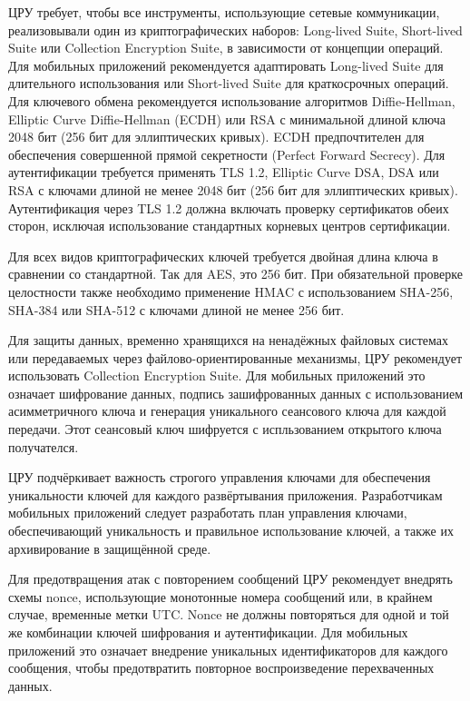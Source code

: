 ЦРУ требует, чтобы все инструменты, использующие сетевые коммуникации, реализовывали один из криптографических наборов: Long-lived Suite, Short-lived Suite или Collection Encryption Suite, в зависимости от концепции операций. Для мобильных приложений рекомендуется адаптировать Long-lived Suite для длительного использования или Short-lived Suite для краткосрочных операций.
Для ключевого обмена рекомендуется использование алгоритмов Diffie-Hellman, Elliptic Curve Diffie-Hellman (ECDH) или RSA с минимальной длиной ключа 2048 бит (256 бит для эллиптических кривых). ECDH предпочтителен для обеспечения совершенной прямой секретности (Perfect Forward Secrecy).
Для аутентификации требуется применять TLS 1.2, Elliptic Curve DSA, DSA или RSA с ключами длиной не менее 2048 бит (256 бит для эллиптических кривых). Аутентификация через TLS 1.2 должна включать проверку сертификатов обеих сторон, исключая использование стандартных корневых центров сертификации.

Для всех видов криптографических ключей требуется двойная длина ключа в сравнении со стандартной. Так для AES, это 256 бит.
При обязательной проверке целостности также необходимо применение HMAC с использованием SHA-256, SHA-384 или SHA-512 с ключами длиной не менее 256 бит.

Для защиты данных, временно хранящихся на ненадёжных файловых системах или передаваемых через файлово-ориентированные механизмы, ЦРУ рекомендует использовать Collection Encryption Suite. Для мобильных приложений это означает шифрование данных, подпись зашифрованных данных с использованием асимметричного ключа и генерация уникального сеансового ключа для каждой передачи. Этот сеансовый ключ шифруется с испльзованием открытого ключа получателся.

ЦРУ подчёркивает важность строгого управления ключами для обеспечения уникальности ключей для каждого развёртывания приложения. Разработчикам мобильных приложений следует разработать план управления ключами, обеспечивающий уникальность и правильное использование ключей, а также их архивирование в защищённой среде.

Для предотвращения атак с повторением сообщений ЦРУ рекомендует внедрять схемы nonce, использующие монотонные номера сообщений или, в крайнем случае, временные метки UTC. Nonce не должны повторяться для одной и той же комбинации ключей шифрования и аутентификации. Для мобильных приложений это означает внедрение уникальных идентификаторов для каждого сообщения, чтобы предотвратить повторное воспроизведение перехваченных данных.

